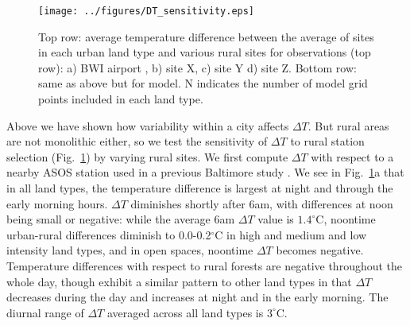 \documentclass[draft,linenumbers]{agujournal}
\begin{document}
\begin{figure}[h]
\centering
\texttt{[image: ../figures/DT\_sensitivity.eps]}
\caption{Top row: average temperature difference between the average of sites in each urban land type and various rural sites for observations (top row): a) BWI airport , b) site X, c) site Y  d) site Z. Bottom row: same as above but for model. N indicates the number of model grid points included in each land type.
}
\label{fig:dt_sensitivity}
\end{figure}

Above we have shown how variability within a city affects $\Delta T$. But rural areas are not monolithic either, so we test the sensitivity of $\Delta T$ to rural station selection  (Fig.~\ref{fig:dt_sensitivity}) by varying rural sites.
 We first compute $\Delta T$ with  respect to a nearby ASOS station used in a previous Baltimore study \citep{li2013synergistic}. We see in Fig.~\ref{fig:dt_sensitivity}a that
in all land types, the temperature difference is largest at night and through the early morning hours.
$\Delta T$ diminishes shortly after 6am, with differences at noon being small or negative: while the average 6am $\Delta T$ value  is $1.4^\circ $C, noontime urban-rural differences diminish to 0.0-0.2$^\circ$C in high and medium and low intensity land types, and in open spaces, noontime $\Delta T$ becomes negative.
Temperature differences with respect to rural forests are negative throughout the whole day, though exhibit a similar pattern to other land types in that $\Delta T$ decreases during the day and increases at night and in the early morning. The diurnal range of $\Delta T$ averaged across all land types is $3^\circ$C. 

\end{document}
